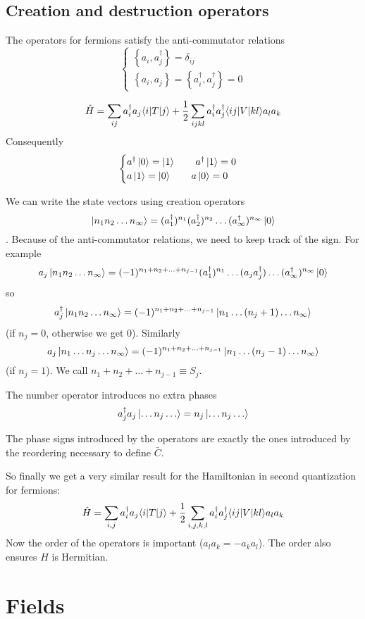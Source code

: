 \subsection{Creation and destruction operators}
The operators for fermions satisfy the anti-commutator relations
\[ \begin{cases}
\left\{a_i,a_j^\dagger\right\} = \delta_{ij} \\
\left\{a_i, a_j\right\} = \left\{a_i^\dagger, a_j^\dagger\right\} = 0
\end{cases} \]

\[ \hat{H} = \sum_{ij}a^\dagger_ia_j \braket[T]{i}{j} + \frac{1}{2}\sum_{ijkl}a^\dagger_i a^\dagger_j \braket[V]{ij}{kl} a_la_k  \]
Consequently
\[ \begin{cases}
a^\dagger\left| 0 \right\rangle = \left| 1 \right\rangle \qquad a^\dagger\left| 1 \right\rangle = 0 \\
a\left| 1 \right\rangle = \left| 0 \right\rangle \qquad a\left| 0 \right\rangle = 0
\end{cases} \]

We can write the state vectors using creation operators
\[ \left| n_1n_2\ldots n_\infty \right\rangle = (a_1^\dagger)^{n_1}(a_2^\dagger)^{n_2}\ldots (a_\infty^\dagger)^{n_\infty}\left| 0 \right\rangle \].
Because of the anti-commutator relations, we need to keep track of the sign. For example
\[ a_j\left| n_1n_2\ldots n_\infty \right\rangle = (-1)^{n_1+n_2+\ldots + n_{j-1}}(a_1^\dagger)^{n_1} \ldots (a_ja_j^\dagger) \ldots (a_\infty^\dagger)^{n_\infty}\left| 0 \right\rangle \]
so
\[ a^\dagger_j\left| n_1n_2\ldots n_\infty \right\rangle = (-1)^{n_1+n_2+\ldots+n_{j-1}}\left| n_1\ldots (n_j+1) \ldots n_\infty \right\rangle \]
(if $n_j = 0$, otherwise we get $0$). Similarly
\[ a_j\left| n_1\ldots n_j\ldots n_\infty \right\rangle = (-1)^{n_1+n_2+\ldots+n_{j-1}}\left| n_1\ldots (n_j-1) \ldots n_\infty \right\rangle \]
(if $n_j = 1$). We call $n_1+n_2+\ldots+n_{j-1} \equiv S_j$.

The number operator introduces no extra phases
\[ a^\dagger_j a_j \left| \ldots n_j \ldots \right\rangle = n_j\left| \ldots n_j \ldots \right\rangle \]

The phase signs introduced by the operators are exactly the ones introduced by the reordering necessary to define $\bar{C}$.

So finally we get a very similar result for the Hamiltonian in second quantization for fermions:
\[ \hat{H} = \sum_{i,j}a_i^\dagger a_j \braket[T]{i}{j} + \frac{1}{2}\sum_{i,j,k,l}a^\dagger_i a^\dagger_j \braket[V]{ij}{kl}a_la_k \]
Now the order of the operators is important ($a_la_k = - a_k a_l$). The order also ensures $\hat{H}$ is Hermitian.

\section{Fields}

